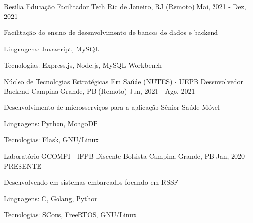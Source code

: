 \begin{cventries}
  \cventry
  {Resilia Educação} %
  {Facilitador Tech} %
  {Rio de Janeiro, RJ (Remoto)} %
  {Mai, 2021 - Dez, 2021} %
  {
    \begin{cvitems} %
      \item {Facilitação do ensino de desenvolvimento de bancos de dados e backend}
      \item {Linguagens: Javascript, MySQL}
      \item {Tecnologias: Express.js, Node.js, MySQL Workbench}
    \end{cvitems}
  }

  \cventry
  {Núcleo de Tecnologias Estratégicas Em Saúde (NUTES) - UEPB} %
  {Desenvolvedor Backend} %
  {Campina Grande, PB (Remoto)} %
  {Jun, 2021 - Ago, 2021} %
  {
    \begin{cvitems} %
      \item {Desenvolvimento de microsserviços para a aplicação Sênior Saúde Móvel}
      \item {Linguagens: Python, MongoDB}
      \item {Tecnologias: Flask, GNU/Linux}
    \end{cvitems}
  }

  \cventry
  {Laboratório GCOMPI - IFPB} %
  {Discente Bolsista} %
  {Campina Grande, PB} %
  {Jan, 2020 - PRESENTE} %
  {
    \begin{cvitems} %
      \item {Desenvolvendo em sistemas embarcados focando em RSSF}
      \item {Linguagens: C, Golang, Python}
      \item {Tecnologias: SCons, FreeRTOS, GNU/Linux}
    \end{cvitems}
  }
\end{cventries}
